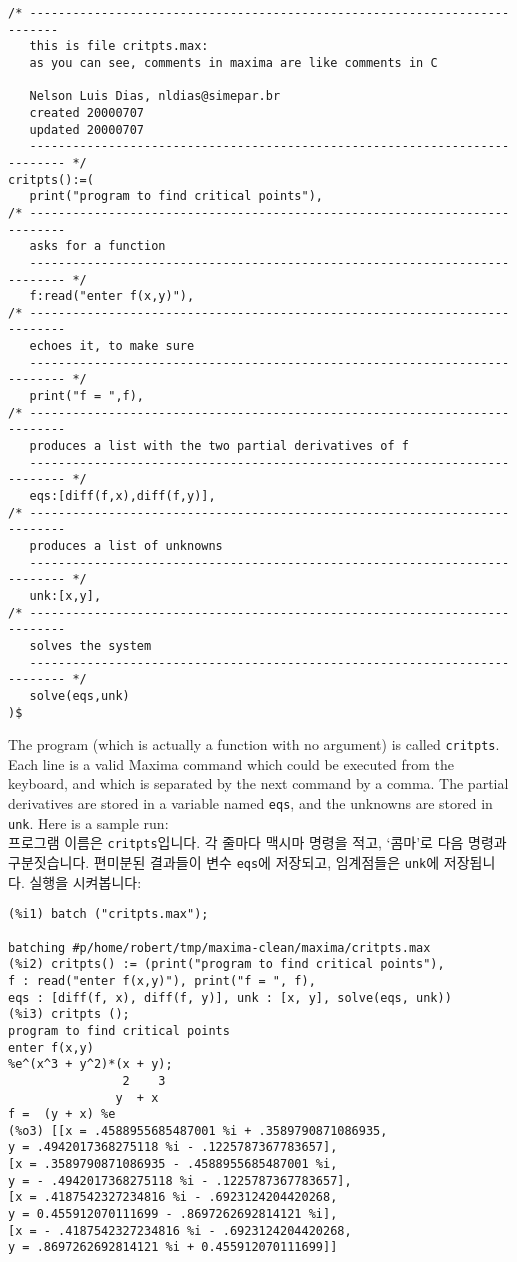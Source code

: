 \documentclass[a4paper,12pt]{article}
\begin{document}
\begin{verbatim}
/* -------------------------------------------------------------------------- 
   this is file critpts.max: 
   as you can see, comments in maxima are like comments in C 

   Nelson Luis Dias, nldias@simepar.br
   created 20000707
   updated 20000707
   --------------------------------------------------------------------------- */
critpts():=(
   print("program to find critical points"),
/* ---------------------------------------------------------------------------
   asks for a function
   --------------------------------------------------------------------------- */
   f:read("enter f(x,y)"),
/* ---------------------------------------------------------------------------
   echoes it, to make sure
   --------------------------------------------------------------------------- */
   print("f = ",f),
/* ---------------------------------------------------------------------------
   produces a list with the two partial derivatives of f
   --------------------------------------------------------------------------- */
   eqs:[diff(f,x),diff(f,y)],
/* ---------------------------------------------------------------------------
   produces a list of unknowns
   --------------------------------------------------------------------------- */
   unk:[x,y],
/* ---------------------------------------------------------------------------
   solves the system
   --------------------------------------------------------------------------- */
   solve(eqs,unk)   
)$
\end{verbatim}
The program (which is actually a function with no argument) is called 
{\tt critpts}. Each line is a valid Maxima command which could be 
executed from the keyboard, and which is separated by the next command 
by a comma.  The partial derivatives are stored in a variable named 
{\tt eqs}, and the unknowns are stored in {\tt unk}.  Here is a sample 
run:\\
프로그램 이름은 {\tt critpts}입니다. 각 줄마다 맥시마 명령을 적고, 
`콤마'로 다음 명령과 구분짓습니다. 편미분된 결과들이 변수 {\tt eqs}에 
저장되고, 임계점들은 {\tt unk}에 저장됩니다. 실행을 시켜봅니다:
\begin{verbatim} 
(%i1) batch ("critpts.max");

batching #p/home/robert/tmp/maxima-clean/maxima/critpts.max
(%i2) critpts() := (print("program to find critical points"), 
f : read("enter f(x,y)"), print("f = ", f), 
eqs : [diff(f, x), diff(f, y)], unk : [x, y], solve(eqs, unk))
(%i3) critpts ();
program to find critical points 
enter f(x,y) 
%e^(x^3 + y^2)*(x + y);
                2    3
               y  + x
f =  (y + x) %e        
(%o3) [[x = .4588955685487001 %i + .3589790871086935, 
y = .4942017368275118 %i - .1225787367783657], 
[x = .3589790871086935 - .4588955685487001 %i, 
y = - .4942017368275118 %i - .1225787367783657], 
[x = .4187542327234816 %i - .6923124204420268, 
y = 0.455912070111699 - .8697262692814121 %i], 
[x = - .4187542327234816 %i - .6923124204420268, 
y = .8697262692814121 %i + 0.455912070111699]]
\end{verbatim}
\end{document}
